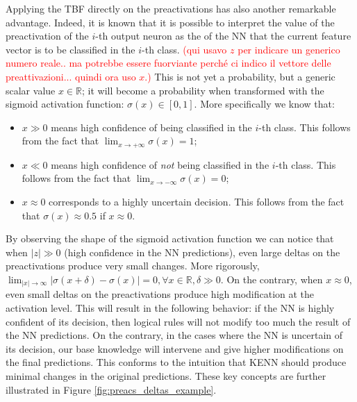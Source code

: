 Applying the TBF directly on the preactivations has also another remarkable advantage. Indeed, it is known that it is  possible to interpret the value of the preactivation of the $i$-th output neuron as the  of the NN that the current feature vector is to be classified in the $i$-th class. 
\textcolor{red}{(qui usavo $z$ per indicare un generico numero reale.. ma potrebbe essere fuorviante perché ci indico il vettore delle preattivazioni... quindi ora uso $x$.)}
This  is not yet a probability, but a generic scalar value $x \in \mathbb{R}$; it will become a probability when transformed with the sigmoid activation function: $\sigma(x) \in \left[0,1\right]$. More specifically we know that:
\begin{itemize}
	\item $x \gg 0$ means high confidence of being classified in the $i$-th class. This follows from the fact that $\lim_{x\rightarrow +\infty} \sigma(x) = 1$;
	\item $x \ll 0$ means high confidence of \textit{not} being classified in the $i$-th class. This follows from the fact that $\lim_{x\rightarrow -\infty} \sigma(x) = 0$;
	\item $x \approx 0$ corresponds to a highly uncertain decision. This follows from the fact that $\sigma(x) \approx 0.5$ if $x \approx 0$.
\end{itemize}

By observing the shape of the sigmoid activation function we can notice that when $|z| \gg 0$ (high confidence in the NN predictions), even large deltas on the preactivations produce very small changes. 
\textcolor{unipd}{More rigorously, $\lim_{|x| \rightarrow \infty} |\sigma(x+\delta)-\sigma(x)| = 0, \forall x\in \mathbb{R}, \delta \gg 0$.} On the contrary, when $x \approx 0$, even small deltas on the preactivations produce high modification at the activation level. 
This will result in the following behavior: if the NN is highly confident of its decision, then logical rules will not modify too much the result of the NN predictions. On the contrary, in the cases where the NN is uncertain of its decision, our base knowledge will intervene and give higher modifications on the final predictions. This conforms to the intuition that KENN should produce minimal changes in the original predictions. These key concepts are further illustrated in Figure \ref{fig:preacs_deltas_example}.

